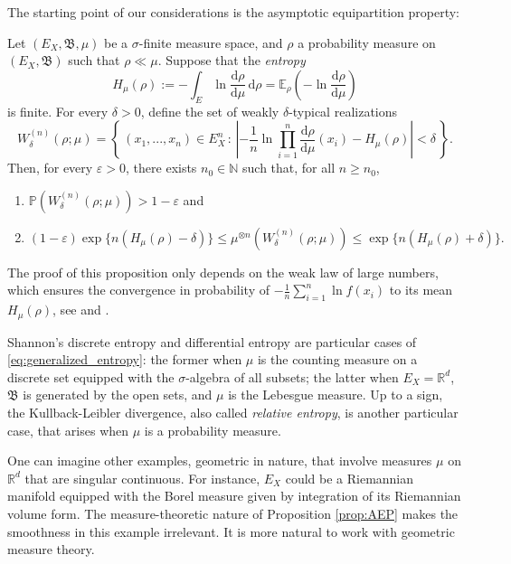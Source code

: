 \documentclass[runningheads]{llncs}
\newcommand{\Exx}[2]{\mathbb{E}_{#1}\left(#2\right)}
\renewcommand{\Pr}[1]{\mathbb{P}\left(#1\right)}
\newcommand{\salg}[1]{\mathfrak {#1}}
\newcommand{\diff}[2]{\frac{\mathrm{d}  #1}{\mathrm{d}  #2}}
\newcommand{\absval}[1]{\left|#1\right|}
\def \d{\mbox{\(\,\mathrm{d}\)}}
\renewcommand{\epsilon}{\varepsilon}
\newcommand{\Rr}{\mathbb{R}}
\newcommand{\Nn}{\mathbb{N}}
\newcommand{\bigset}[2]{\left\{\,#1 \, : \, #2\,\right\} }
\newcommand{\ent}[1]{H_{#1}}
\begin{document}
The starting point of our considerations is the asymptotic equipartition property: 

\begin{proposition}[AEP]\label{prop:AEP}
Let $(E_X,\salg B,\mu)$ be a $\sigma$-finite measure space, and $\rho$ a probability measure on $(E_X,\salg B)$ such that  $\rho \ll \mu$. Suppose that the \emph{entropy}
\begin{equation}
    H_{\mu}(\rho) := -\int_{E} \ln \diff{\rho}{\mu} \d\rho =\Exx{\rho}{-\ln \diff{\rho}{\mu}}
\end{equation}
is finite. For every $\delta >0$, define the set of weakly $\delta$-typical realizations
\begin{equation}\label{eq:generalized_entropy}
W^{(n)}_\delta(\rho;\mu) =\bigset{(x_1,...,x_n)\in E_X^n}{\absval{-\frac 1n\ln \prod_{i=1}^n \diff\rho\mu(x_i) - \ent \mu(\rho)} < \delta}.
\end{equation}
Then,  for every $\epsilon>0$, there exists $n_0\in \Nn$ such that, for all $n\geq n_0$,
\begin{enumerate}
    \item $\Pr{W_\delta^{(n)}(\rho;\mu)}>1-\epsilon$ and
    \item $(1-\epsilon)  \exp\{n(\ent\mu(\rho)-\delta)\} \leq \mu^{\otimes n}(W_\delta^{(n)}(\rho;\mu)) \leq \exp\{n(\ent\mu(\rho)+\delta)\}. $
\end{enumerate}
\end{proposition}

The proof of this proposition only depends on the weak law of large numbers, which ensures the convergence in probability of $-\frac 1n \sum_{i=1}^n \ln f(x_i)$ to its mean $H_{\mu}(\rho)$, see \cite[Ch.~12]{Vigneaux2019-thesis} and \cite[Ch.~8]{Cover2006}.

Shannon's discrete entropy and differential entropy are particular cases of \eqref{eq:generalized_entropy}: the former when $\mu$ is the counting measure on a discrete set equipped with the $\sigma$-algebra of all subsets; the latter when $E_X=\Rr^d$, $\salg B$ is generated by the open sets, and $\mu$ is the Lebesgue measure. Up to a sign, the Kullback-Leibler divergence, also called \emph{relative entropy}, is another particular case, that arises when $\mu$ is a probability measure. 

One can imagine other examples,  geometric in nature, that involve measures $\mu$ on $\Rr^d$ that are singular continuous. For instance, $E_X$ could be a Riemannian manifold equipped with the Borel measure given by integration of its Riemannian volume form. The measure-theoretic nature of Proposition \ref{prop:AEP} makes the smoothness in this example  irrelevant. It is more natural to work with geometric measure theory. 
\end{document}
